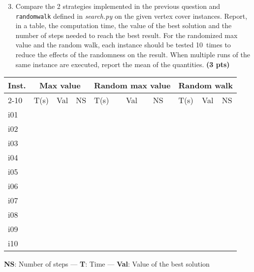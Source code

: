 \documentclass[11pt,a4paper]{report}
\begin{document}
\begin{answers}[2.5 cm]
\end{answers}



\begin{enumerate}
\setcounter{enumi}{2}
\item Compare the 2 strategies implemented in the previous question and \texttt{randomwalk} defined in \textit{search.py} on the given vertex cover instances. 
	Report, in a table, the computation
    time, the value of the best solution and the number of steps needed to reach the best result. For the
    randomized max value and the random walk, each instance should be tested 10~times to reduce
    the effects of the randomness on the result. When multiple runs of the same instance
    are executed, report the mean of the quantities. \textbf{(3 pts)}
\end{enumerate}

\begin{answers}[7cm]
\begin{center}
\begin{tabular}{||l||l|l|l||l|l|l||l|l|l||}
\hline
\multirow{3}{*}{Inst.} & \multicolumn{3}{c||}{Max value} & \multicolumn{3}{c||}{Random max value} & \multicolumn{3}{c||}{Random walk} \\
\cline{2-10}
\cline{2-10}
 & T(s) & Val & NS & T(s) & Val & NS & T(s) & Val & NS\\
\hline
i01 & & & & & & & & &\\
\hline
i02 & & & & & & & & &\\
\hline
i03 & & & & & & & & &\\
\hline
i04 & & & & & & & & &\\
\hline
i05 & & & & & & & & &\\
\hline
i06 & & & & & & & & &\\
\hline
i07 & & & & & & & & &\\
\hline
i08 & & & & & & & & &\\
\hline
i09 & & & & & & & & &\\
\hline
i10 & & & & & & & & &\\
\hline
\end{tabular}
\end{center}
\textbf{NS}: Number of steps — \textbf{T}: Time — \textbf{Val}: Value of the best solution
\end{answers}
\end{document}
